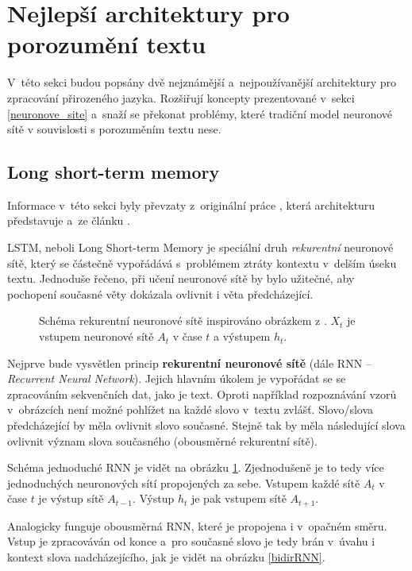 \section{Nejlepší architektury pro porozumění textu}
V~této sekci budou popsány dvě nejznámější a~nejpoužívanější architektury pro zpracování přirozeného jazyka. Rozšiřují koncepty prezentované v~sekci \ref{neuronove_site} a~snaží se překonat problémy, které tradiční model neuronové sítě v souvislosti s porozuměním textu nese.\par

\subsection{Long short-term memory}
\label{lstm}
Informace v~této sekci byly převzaty z~originální práce \cite{LSTM}, která architekturu představuje a~ze článku \cite{understandingLSTM}.\par
LSTM, neboli Long Short-term Memory je speciální druh \emph{rekurentní} neuronové sítě, který se částečně vypořádává s~problémem ztráty kontextu v~delším úseku textu. Jednoduše řečeno, při učení neuronové sítě by bylo užitečné, aby pochopení současné věty dokázala ovlivnit i věta předcházející.\par

\begin{figure}[hbt]
    \centering
	\caption{Schéma rekurentní neuronové sítě inspirováno obrázkem z \cite{understandingLSTM}. $X_t$ je vstupem neuronové sítě $A_t$ v čase $t$ a výstupem $h_t$.}
	\label{RNN}
\end{figure}

Nejprve bude vysvětlen princip \textbf{rekurentní neuronové sítě} (dále RNN -- \textit{Recurrent Neural Network}).
Jejich hlavním úkolem je vypořádat se se zpracováním sekvenčních dat, jako je text. Oproti například rozpoznávání vzorů v~obrázcích není možné pohlížet na každé slovo v~textu zvlášť. Slovo/slova předcházející by měla ovlivnit slovo současné. Stejně tak by měla následující slova ovlivnit význam slova současného (obousměrné rekurentní sítě).\par
Schéma jednoduché RNN je vidět na obrázku \ref{RNN}. Zjednodušeně je to tedy více jednoduchých neuronových sítí propojených za sebe. Vstupem každé sítě $A_t$ v čase $t$ je výstup sítě $A_{t-1}$. Výstup $h_t$ je pak vstupem sítě $A_{t+1}$.\par
Analogicky funguje obousměrná RNN, které je propojena i v~opačném směru. Vstup je zpracováván od konce a~pro současné slovo je tedy brán v~úvahu i kontext slova nadcházejícího, jak je vidět na obrázku \ref{bidirRNN}.\par

